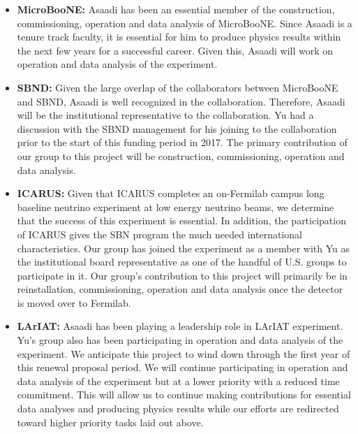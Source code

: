 \begin{itemize}
\begin{itemize}

\item{{\bf MicroBooNE:} Asaadi has been an essential member of the construction, commissioning, operation and data analysis of MicroBooNE.   Since Asaadi is a tenure track faculty, it is essential for him to produce physics results within the next few years for a successful career.  Given this, Asaadi will work on operation and data analysis of the experiment.}

\item {{\bf SBND:} Given the large overlap of the collaborators between MicroBooNE and SBND, Asaadi is well recognized in the collaboration.  Therefore, Asaadi will be the institutional representative to the collaboration.  Yu had a discussion with the SBND management for his joining to the collaboration prior to the start of this funding period in 2017.  The primary contribution of our group to this project will be construction, commissioning, operation and data analysis.}

\item{{\bf ICARUS:} Given that ICARUS completes an on-Fermilab campus long baseline neutrino experiment at low energy neutrino beams, we determine that the success of this experiment is essential.  In addition, the participation of ICARUS gives the SBN program the much needed international characteristics.   Our group has joined the experiment as a member with Yu as the institutional board representative as one of the handful of U.S. groups to participate in it.   Our group's contribution to this project will primarily be in reinstallation, commissioning, operation and data analysis once the detector is moved over to Fermilab.}

\item{{\bf LArIAT:} Asaadi has been playing a leadership role in LArIAT experiment.  Yu's group also has been participating in operation and data analysis of the experiment.   We anticipate this project to wind down through the first year of this renewal proposal period.  We will continue participating in operation and data analysis of the experiment but at a lower priority with a reduced time commitment.  This will allow us to continue making contributions for essential data analyses and producing physics results while our efforts are redirected toward higher priority tasks laid out above.}
\end{itemize}

\end{itemize}


